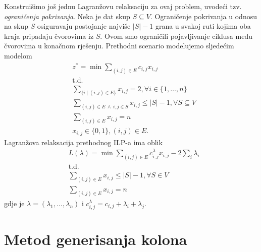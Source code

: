 \documentclass[b5paper, utf8, 11pt, colorlinks]{book}
\theoremstyle{definition}
\begin{document}
Konstruišimo još jednu Lagranžovu relaksaciju za ovaj problem,  uvodeći tzv. \emph{ograničenja pokrivanja}. Neka je dat skup $S\subseteq V$. Ograničenje pokrivanja u odnosu na skup $S$ osiguravaju postojanje najviše $|S|-1$ grana u svakoj ruti kojima oba kraja pripadaju čvorovima iz $S$. Ovom smo ograničili pojavljivanje ciklusa među čvorovima u konačnom rješenju.
Prethodni scenario modelujemo sljedećim modelom 
\begin{align*}
     & z^* = \min \sum_{(i,j)\in E} c_{i,j} x_{i,j} \\
     & \mbox{t.d.} \\
     & \sum_{ \{ i \mid (i,j) \in E \} } x_{i,j} = 2, \forall i \in \{1,\ldots, n \} \\
     & \sum_{(i,j) \in E \ \wedge\ i,j \in S} x_{i,j} \leq |S|-1, \forall S \subseteq V  \\
     &   \sum_{(i,j) \in E} x_{i,j} = n  \\
     & x_{i,j} \in \{0, 1 \}, (i,j)\in E.
\end{align*}
Lagranžova relaksacija prethodnog ILP-a ima oblik 
\begin{align*}
 &L(\lambda) = \min \sum_{(i,j)\in E} c^\lambda_{i,j} x_{i,j} - 2 \sum_{i} \lambda_i \\
 & \mbox{t.d.} \\
 & \sum_{(i,j) \in E} x_{i,j} \leq |S|-1, \forall S \in V \\
 & \sum_{(i,j) \in E} x_{i,j} = n
\end{align*}
gdje je $\lambda=(\lambda_1, \ldots, \lambda_n)$ i $c^\lambda_{i,j} = c_{i,j} + \lambda_i + \lambda_j$. 

\section{Metod generisanja kolona}%
\end{document}
